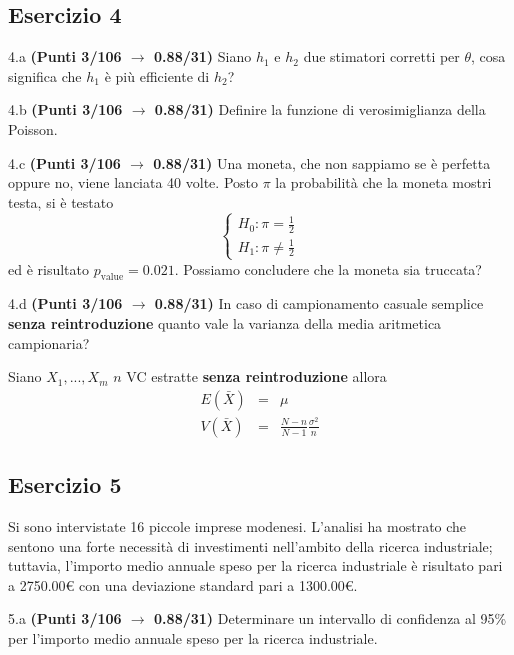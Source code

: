 \documentclass[
  11pt,
]{book}
\theoremstyle{mytheoremstyle}
\theoremstyle{mydefstyle}
\newenvironment{sol}
  {
  \begin{tcolorbox}[enhanced,breakable,arc=0.1mm,boxrule=1pt,colback=white,colframe=iblue,
  title=\bf \fontfamily{lmss}\selectfont \hspace{.5 cm} Soluzione,drop fuzzy shadow]

}{
\end{tcolorbox}
  }
\begin{document}
\subsection{Esercizio 4}\label{esercizio-4-8}

4.a \textbf{(Punti 3/106 \(\rightarrow\) 0.88/31)} Siano \(h_1\) e \(h_2\) due stimatori corretti per \(\theta\), cosa significa che \(h_1\) è più efficiente di \(h_2\)?

4.b \textbf{(Punti 3/106 \(\rightarrow\) 0.88/31)} Definire la funzione di verosimiglianza della Poisson.

4.c \textbf{(Punti 3/106 \(\rightarrow\) 0.88/31)} Una moneta, che non sappiamo se è perfetta oppure no, viene lanciata 40 volte.
Posto \(\pi\) la probabilità che la moneta mostri testa, si è testato
\[
\begin{cases}
H_0:\pi=\frac 12\\
H_1:\pi\ne\frac 12
\end{cases}
\]
ed è risultato \(p_\text{value}=0.021\). Possiamo concludere che la moneta sia truccata?

4.d \textbf{(Punti 3/106 \(\rightarrow\) 0.88/31)} In caso di campionamento casuale semplice \textbf{senza reintroduzione}
quanto vale la varianza della media aritmetica campionaria?

\begin{sol}
Siano \(X_1,...,X_m\) \(n\) VC estratte \textbf{senza reintroduzione} allora
\begin{eqnarray*}
  E(\bar X) &=&  \mu\\
  V(\bar X) &=& \frac{N-n}{N-1}\frac{\sigma^2}{n}
\end{eqnarray*}

\end{sol}

\subsection{Esercizio 5}\label{esercizio-5-7}

Si sono intervistate 16 piccole imprese modenesi.
L'analisi ha mostrato che sentono una forte necessità
di investimenti nell'ambito della ricerca industriale;
tuttavia, l'importo medio annuale speso per la ricerca industriale
è risultato pari a 2750.00€ con una deviazione standard pari
a 1300.00€.

5.a \textbf{(Punti 3/106 \(\rightarrow\) 0.88/31)} Determinare un intervallo di confidenza al 95\%
per l'importo medio annuale speso per la ricerca industriale.
\end{document}
